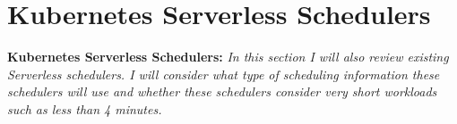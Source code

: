 %
%
%
%
%
%

\section{Kubernetes Serverless Schedulers}
\begin{tcolorbox}[boxsep=0mm,left=2.5mm,right=2.5mm] \textbf{Kubernetes
Serverless Schedulers:} {\em In this section I will also review existing
    Serverless schedulers. I will consider what type of scheduling information
    these schedulers will use and whether these schedulers consider very short
    workloads such as less than 4 minutes.}
\end{tcolorbox}

